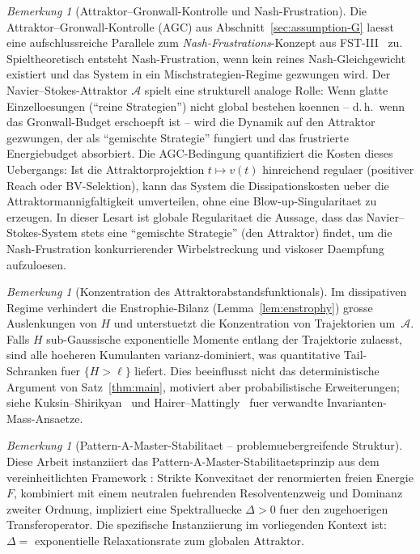\documentclass[12pt,a4paper]{article}
\theoremstyle{definition}
\theoremstyle{plain}
\theoremstyle{remark}
\newtheorem{remark}[definition]{Bemerkung}
\begin{document}
\begin{remark}[Attraktor--Gronwall-Kontrolle und Nash-Frustration]
\label{rem:agc-nash-frustration}
Die Attraktor--Gronwall-Kontrolle (AGC) aus
Abschnitt~\ref{sec:assumption-G} laesst eine aufschlussreiche Parallele
zum \emph{Nash-Frustrations}-Konzept aus FST-III~\cite{FST-Unified2026}
zu. Spieltheoretisch entsteht Nash-Frustration, wenn kein reines
Nash-Gleichgewicht existiert und das System in ein
Mischstrategien-Regime gezwungen wird.
Der Navier--Stokes-Attraktor $\mathcal{A}$ spielt eine strukturell
analoge Rolle: Wenn glatte Einzelloesungen (``reine Strategien'')
nicht global bestehen koennen -- d.\,h.\ wenn das Gronwall-Budget
erschoepft ist -- wird die Dynamik auf den Attraktor gezwungen, der
als ``gemischte Strategie'' fungiert und das frustrierte Energiebudget
absorbiert. Die AGC-Bedingung quantifiziert die Kosten dieses
Uebergangs: Ist die Attraktorprojektion $t \mapsto v(t)$ hinreichend
regulaer (positiver Reach oder BV-Selektion), kann das System die
Dissipationskosten ueber die Attraktormannigfaltigkeit umverteilen,
ohne eine Blow-up-Singularitaet zu erzeugen. In dieser Lesart ist
globale Regularitaet die Aussage, dass das Navier--Stokes-System
stets eine ``gemischte Strategie'' (den Attraktor) findet, um die
Nash-Frustration konkurrierender Wirbelstreckung und viskoser
Daempfung aufzuloesen.
\end{remark}

\begin{remark}[Konzentration des Attraktorabstandsfunktionals]
\label{rem:cumulants}
Im dissipativen Regime verhindert die Enstrophie-Bilanz
(Lemma~\ref{lem:enstrophy}) grosse Auslenkungen von $H$ und
unterstuetzt die Konzentration von Trajektorien um~$\mathcal{A}$.
Falls $H$ sub-Gaussische exponentielle Momente entlang der Trajektorie zulaesst,
sind alle hoeheren Kumulanten varianz-dominiert, was quantitative
Tail-Schranken fuer $\{H > \ell\}$ liefert. Dies beeinflusst nicht das deterministische
Argument von Satz~\ref{thm:main}, motiviert aber probabilistische
Erweiterungen; siehe
Kuksin--Shirikyan~\cite{KuksinShirikyan2012} und
Hairer--Mattingly~\cite{HairerMattingly2006} fuer verwandte Invarianten-Mass-Ansaetze.
\end{remark}

\begin{remark}[Pattern-A-Master-Stabilitaet -- problemuebergreifende Struktur]
Diese Arbeit instanziiert das Pattern-A-Master-Stabilitaetsprinzip aus dem vereinheitlichten Framework \cite{FST-Unified2026}: Strikte Konvexitaet der renormierten freien Energie $F$, kombiniert mit einem neutralen fuehrenden Resolventenzweig und Dominanz zweiter Ordnung, impliziert eine Spektralluecke $\Delta > 0$ fuer den zugehoerigen Transferoperator. Die spezifische Instanziierung im vorliegenden Kontext ist: $\Delta = $ exponentielle Relaxationsrate zum globalen Attraktor.
\end{remark}
\end{document}
